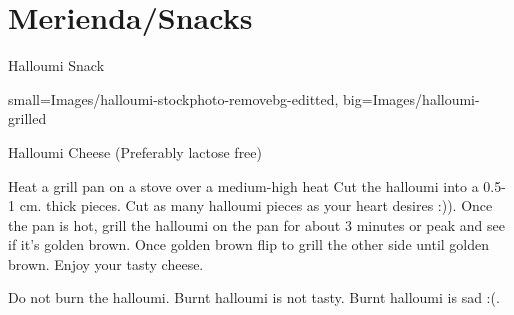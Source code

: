 \chapter{Merienda/Snacks}
\begin{recipe}
[ %
	preparationtime = {\unit[20]{min}},
	portion = \portion{1},
	source = D. Pattanakul
]
{{Halloumi Snack}}
	
	\graph
	{%
		small=Images/halloumi-stockphoto-removebg-editted,	%
		big=Images/halloumi-grilled %
	}
	
	\ingredients
	{%
		Halloumi Cheese (Preferably lactose free)
	}
	
	\preparation
	{ %
	    \step[1] Heat a grill pan on a stove over a medium-high heat 
		\step Cut the halloumi into a 0.5-1 cm. thick pieces. Cut as many halloumi pieces as your heart desires :)).
		\step Once the pan is hot, grill the halloumi on the pan for about 3 minutes or peak and see if it's golden brown. Once golden brown flip to grill the other side until golden brown.
		\step[1] Enjoy your tasty cheese.
	}
	
	\hint
	{%
		Do not burn the halloumi. Burnt halloumi is not tasty. Burnt halloumi is sad :(.
	}

\end{recipe}

